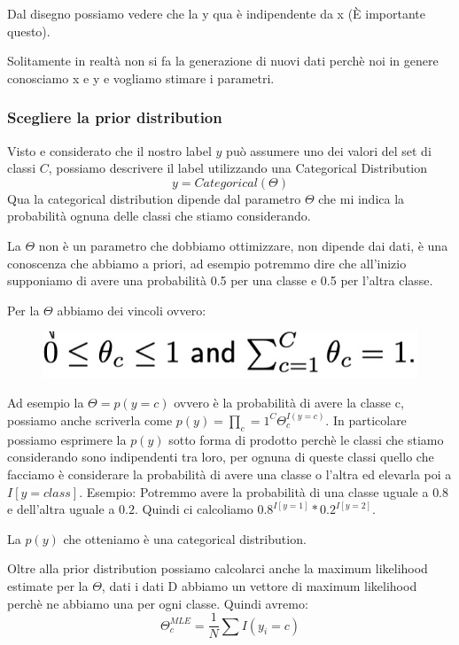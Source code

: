 \documentclass[14pt]{extreport}
\begin{document}
Dal disegno possiamo vedere che la y qua è indipendente da x (È importante questo).

Solitamente in realtà non si fa la generazione di nuovi dati perchè noi in genere conosciamo x e y e vogliamo stimare i parametri.

\subsubsection{Scegliere la prior distribution}

Visto e considerato che il nostro label $y$ può assumere uno dei valori del set di classi $C$, possiamo descrivere il label utilizzando una
Categorical Distribution $$y = Categorical(\Theta)$$ Qua la categorical distribution dipende dal parametro $\Theta$ che mi indica la probabilità
ognuna delle classi che stiamo considerando.

La $\Theta$ non è un parametro che dobbiamo ottimizzare, non dipende dai dati, è una conoscenza che abbiamo a priori, ad esempio potremmo dire che
all'inizio supponiamo di avere una probabilità 0.5 per una classe e 0.5 per l'altra classe.

Per la $\Theta$ abbiamo dei vincoli ovvero:
\begin{figure}[H]
\centering
\includegraphics[width=0.5\linewidth]{161.jpeg}
\end{figure}

Ad esempio la $\Theta = p(y=c)$ ovvero è la probabilità di avere la classe c, possiamo anche scriverla come $p(y) = \prod_c=1^C \Theta_c^{I(y=c)}$. In
particolare possiamo esprimere la $p(y)$ sotto forma di prodotto perchè le classi che stiamo considerando sono indipendenti tra loro, per ognuna di
queste classi quello che facciamo è considerare la probabilità di avere una classe o l'altra ed elevarla poi a $I[y=class]$. Esempio: Potremmo avere
la probabilità di una classe uguale a $0.8$ e dell'altra uguale a $0.2$. Quindi ci calcoliamo $0.8^{I[y=1]}*0.2^{I[y=2]}$.

La $p(y)$ che otteniamo è una categorical distribution.

Oltre alla prior distribution possiamo calcolarci anche la maximum likelihood estimate per la $\Theta$, dati i dati D abbiamo un vettore di maximum
likelihood perchè ne abbiamo una per ogni classe. Quindi avremo: $$\Theta_c^{MLE} = \frac{1}{N}\sum I(y_i = c)$$
\end{document}
